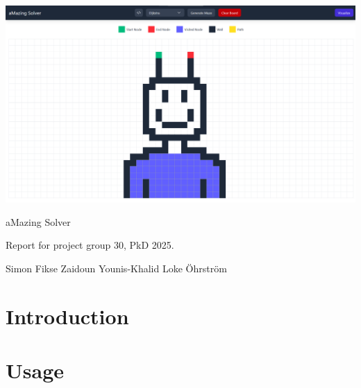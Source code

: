 \documentclass[12pt, a4paper]{article}
\begin{document}
\begin{titlepage}
    \vspace*{\fill}
    \begin{center}

        \includegraphics[width=\textwidth]{amazingguy.png}
        \vspace{5mm}

        \begin{LARGE}
            aMazing Solver
        \end{LARGE}

        \vspace{5mm}

        \begin{large}
            Report for project group 30, PkD 2025.
        \end{large}

        \vspace{5mm}

        Simon Fikse \quad Zaidoun Younis-Khalid \quad Loke Öhrström

    \end{center}
    \vspace*{\fill}
\end{titlepage}

\newpage
\tableofcontents
\newpage

\section{Introduction}


\section{Usage}

\newpage
\end{document}
